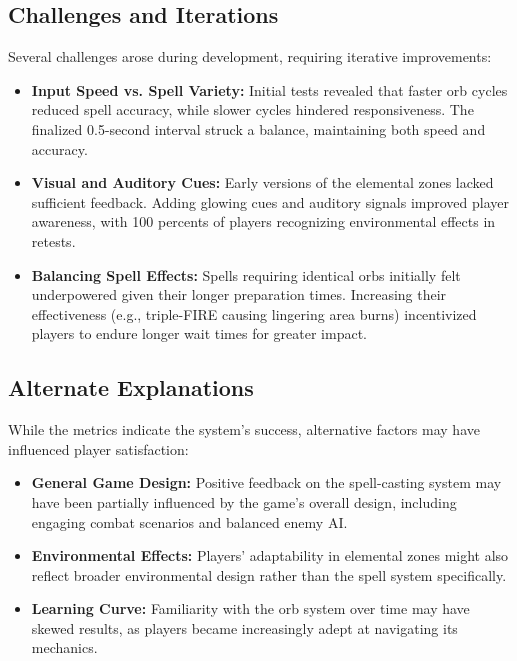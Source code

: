 \documentclass[10pt,twocolumn]{article}
\begin{document}
\subsection{Challenges and Iterations} Several challenges arose during development, requiring iterative improvements: 
\begin{itemize} 
    \item \textbf{Input Speed vs. Spell Variety:} Initial tests revealed that faster orb cycles reduced spell accuracy, while slower cycles hindered responsiveness. The finalized 0.5-second interval struck a balance, maintaining both speed and accuracy. 
    \item \textbf{Visual and Auditory Cues:} Early versions of the elemental zones lacked sufficient feedback. Adding glowing cues and auditory signals improved player awareness, with 100 percents of players recognizing environmental effects in retests. 
    \item \textbf{Balancing Spell Effects:} Spells requiring identical orbs initially felt underpowered given their longer preparation times. Increasing their effectiveness (e.g., triple-FIRE causing lingering area burns) incentivized players to endure longer wait times for greater impact. 
\end{itemize}

\subsection{Alternate Explanations} While the metrics indicate the system’s success, alternative factors may have influenced player satisfaction: 
\begin{itemize} 
    \item \textbf{General Game Design:} Positive feedback on the spell-casting system may have been partially influenced by the game’s overall design, including engaging combat scenarios and balanced enemy AI. 
    \item \textbf{Environmental Effects:} Players’ adaptability in elemental zones might also reflect broader environmental design rather than the spell system specifically. 
    \item \textbf{Learning Curve:} Familiarity with the orb system over time may have skewed results, as players became increasingly adept at navigating its mechanics. 
\end{itemize}
\end{document}
